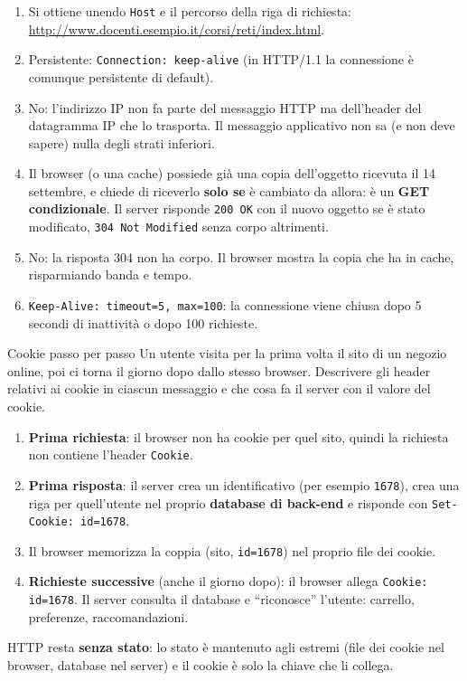 \svolgimento
\begin{enumerate}[label=(\alph*)]
    \item Si ottiene unendo \texttt{Host} e il percorso della riga di richiesta: \url{http://www.docenti.esempio.it/corsi/reti/index.html}.
    \item Persistente: \texttt{Connection: keep-alive} (in HTTP/1.1 la connessione è comunque persistente di default).
    \item No: l'indirizzo IP non fa parte del messaggio HTTP ma dell'header del datagramma IP che lo trasporta. Il messaggio
          applicativo non sa (e non deve sapere) nulla degli strati inferiori.
    \item Il browser (o una cache) possiede già una copia dell'oggetto ricevuta il 14 settembre, e chiede di riceverlo
          \textbf{solo se} è cambiato da allora: è un \textbf{GET condizionale}. Il server risponde \texttt{200 OK} con il nuovo
          oggetto se è stato modificato, \texttt{304 Not Modified} senza corpo altrimenti.
    \item No: la risposta 304 non ha corpo. Il browser mostra la copia che ha in cache, risparmiando banda e tempo.
    \item \texttt{Keep-Alive: timeout=5, max=100}: la connessione viene chiusa dopo 5 secondi di inattività o dopo 100 richieste.
\end{enumerate}

\begin{esercizio}{Cookie passo per passo}
Un utente visita per la prima volta il sito di un negozio online, poi ci torna il giorno dopo dallo stesso browser.
Descrivere gli header relativi ai cookie in ciascun messaggio e che cosa fa il server con il valore del cookie.
\end{esercizio}

\svolgimento
\begin{enumerate}
    \item \textbf{Prima richiesta}: il browser non ha cookie per quel sito, quindi la richiesta non contiene l'header
          \texttt{Cookie}.
    \item \textbf{Prima risposta}: il server crea un identificativo (per esempio \texttt{1678}), crea una riga per quell'utente
          nel proprio \textbf{database di back-end} e risponde con \texttt{Set-Cookie: id=1678}.
    \item Il browser memorizza la coppia (sito, \texttt{id=1678}) nel proprio file dei cookie.
    \item \textbf{Richieste successive} (anche il giorno dopo): il browser allega \texttt{Cookie: id=1678}. Il server consulta il
          database e ``riconosce'' l'utente: carrello, preferenze, raccomandazioni.
\end{enumerate}
HTTP resta \textbf{senza stato}: lo stato è mantenuto agli estremi (file dei cookie nel browser, database nel server) e il
cookie è solo la chiave che li collega.

